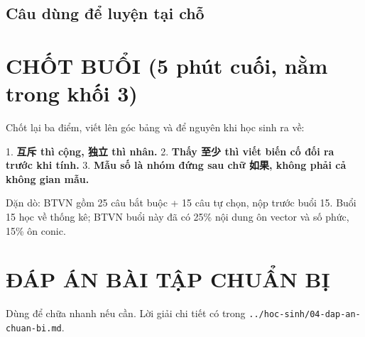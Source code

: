 \documentclass[11pt, a4paper]{article}
\begin{document}
\subsection{Câu dùng để luyện tại chỗ}


\section{CHỐT BUỔI (5 phút cuối, nằm trong khối 3)}

Chốt lại ba điểm, viết lên góc bảng và để nguyên khi học sinh ra về:

1. \textbf{互斥 thì cộng, 独立 thì nhân.}
2. \textbf{Thấy 至少 thì viết biến cố đối ra trước khi tính.}
3. \textbf{Mẫu số là nhóm đứng sau chữ 如果, không phải cả không gian mẫu.}

Dặn dò: BTVN gồm 25 câu bắt buộc + 15 câu tự chọn, nộp trước buổi 15. Buổi 15 học về thống kê; BTVN buổi này đã có 25\% nội dung ôn vector và số phức, 15\% ôn conic.

\section{ĐÁP ÁN BÀI TẬP CHUẨN BỊ}

Dùng để chữa nhanh nếu cần. Lời giải chi tiết có trong \texttt{../hoc-sinh/04-dap-an-chuan-bi.md}.

\end{document}
